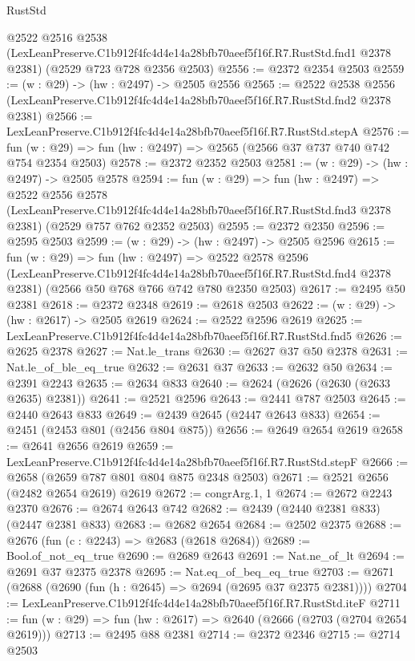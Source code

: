 \begin{lexlean}{RustStd}
\begin{coremodule}
  @2522
    @2516
    @2538
    (LexLeanPreserve.C1b912f4fc4d4e14a28bfb70aeef5f16f.R7.RustStd.fnd1 @2378 @2381)
    (@2529 @723 @728 @2356 @2503)
@2556 := @2372 @2354 @2503
@2559 := (w : @29) -> (hw : @2497) -> @2505 @2556
@2565 := @2522
    @2538
    @2556
    (LexLeanPreserve.C1b912f4fc4d4e14a28bfb70aeef5f16f.R7.RustStd.fnd2 @2378 @2381)
@2566 := LexLeanPreserve.C1b912f4fc4d4e14a28bfb70aeef5f16f.R7.RustStd.stepA
@2576 := fun (w : @29) => fun (hw : @2497) => @2565 (@2566 @37 @737 @740 @742 @754 @2354 @2503)
@2578 := @2372 @2352 @2503
@2581 := (w : @29) -> (hw : @2497) -> @2505 @2578
@2594 := fun (w : @29) =>
  fun (hw : @2497) =>
  @2522
    @2556
    @2578
    (LexLeanPreserve.C1b912f4fc4d4e14a28bfb70aeef5f16f.R7.RustStd.fnd3 @2378 @2381)
    (@2529 @757 @762 @2352 @2503)
@2595 := @2372 @2350
@2596 := @2595 @2503
@2599 := (w : @29) -> (hw : @2497) -> @2505 @2596
@2615 := fun (w : @29) =>
  fun (hw : @2497) =>
  @2522
    @2578
    @2596
    (LexLeanPreserve.C1b912f4fc4d4e14a28bfb70aeef5f16f.R7.RustStd.fnd4 @2378 @2381)
    (@2566 @50 @768 @766 @742 @780 @2350 @2503)
@2617 := @2495 @50 @2381
@2618 := @2372 @2348
@2619 := @2618 @2503
@2622 := (w : @29) -> (hw : @2617) -> @2505 @2619
@2624 := @2522 @2596 @2619
@2625 := LexLeanPreserve.C1b912f4fc4d4e14a28bfb70aeef5f16f.R7.RustStd.fnd5
@2626 := @2625 @2378
@2627 := Nat.le_trans
@2630 := @2627 @37 @50 @2378
@2631 := Nat.le_of_ble_eq_true
@2632 := @2631 @37
@2633 := @2632 @50
@2634 := @2391 @2243
@2635 := @2634 @833
@2640 := @2624 (@2626 (@2630 (@2633 @2635) @2381))
@2641 := @2521 @2596
@2643 := @2441 @787 @2503
@2645 := @2440 @2643 @833
@2649 := @2439 @2645 (@2447 @2643 @833)
@2654 := @2451 (@2453 @801 (@2456 @804 @875))
@2656 := @2649 @2654 @2619
@2658 := @2641 @2656 @2619
@2659 := LexLeanPreserve.C1b912f4fc4d4e14a28bfb70aeef5f16f.R7.RustStd.stepF
@2666 := @2658 (@2659 @787 @801 @804 @875 @2348 @2503)
@2671 := @2521 @2656 (@2482 @2654 @2619) @2619
@2672 := congrArg.{1, 1}
@2674 := @2672 @2243 @2370
@2676 := @2674 @2643 @742
@2682 := @2439 (@2440 @2381 @833) (@2447 @2381 @833)
@2683 := @2682 @2654
@2684 := @2502 @2375
@2688 := @2676 (fun (c : @2243) => @2683 (@2618 @2684))
@2689 := Bool.of_not_eq_true
@2690 := @2689 @2643
@2691 := Nat.ne_of_lt
@2694 := @2691 @37 @2375 @2378
@2695 := Nat.eq_of_beq_eq_true
@2703 := @2671 (@2688 (@2690 (fun (h : @2645) => @2694 (@2695 @37 @2375 @2381))))
@2704 := LexLeanPreserve.C1b912f4fc4d4e14a28bfb70aeef5f16f.R7.RustStd.iteF
@2711 := fun (w : @29) => fun (hw : @2617) => @2640 (@2666 (@2703 (@2704 @2654 @2619)))
@2713 := @2495 @88 @2381
@2714 := @2372 @2346
@2715 := @2714 @2503

\end{coremodule}
\end{lexlean}
